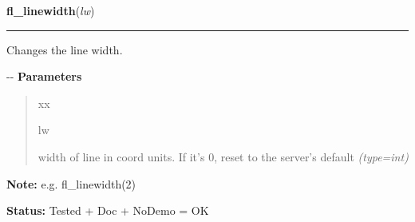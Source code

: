     \label{xformslib:flxbasic:fl_linewidth}

    \vspace{0.5ex}

\hspace{.8\funcindent}\begin{boxedminipage}{\funcwidth}

    \raggedright \textbf{fl\_linewidth}(\textit{lw})

    \vspace{-1.5ex}

    \rule{\textwidth}{0.5\fboxrule}
\setlength{\parskip}{2ex}

Changes the line width.

-{}-
\setlength{\parskip}{1ex}
      \textbf{Parameters}
      \vspace{-1ex}

      \begin{quote}
        \begin{Ventry}{xx}

          \item[lw]


width of line in coord units. If it's 0, reset to the server's
default
            {\it (type=int)}

        \end{Ventry}

      \end{quote}

\textbf{Note:} 
e.g. fl\_linewidth(2)


\textbf{Status:} 
Tested + Doc + NoDemo = OK


    \end{boxedminipage}

    \label{xformslib:flxbasic:fl_linewidth}

    \vspace{0.5ex}

